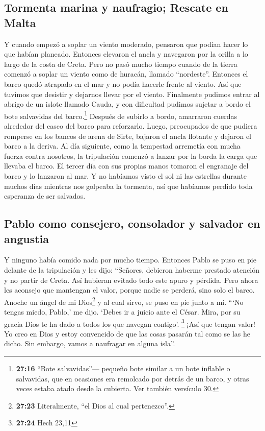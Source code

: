 \hypertarget{tormenta-marina-y-naufragio-rescate-en-malta}{%
\subsection{Tormenta marina y naufragio; Rescate en
Malta}\label{tormenta-marina-y-naufragio-rescate-en-malta}}

 Y cuando empezó a soplar un viento moderado, pensaron
que podían hacer lo que habían planeado. Entonces elevaron el ancla y
navegaron por la orilla a lo largo de la costa de Creta. 
Pero no pasó mucho tiempo cuando de la tierra comenzó a soplar un viento
como de huracán, llamado ``nordeste''.  Entonces el barco
quedó atrapado en el mar y no podía hacerle frente al viento. Así que
tuvimos que desistir y dejarnos llevar por el viento. 
Finalmente pudimos entrar al abrigo de un islote llamado Cauda, y con
dificultad pudimos sujetar a bordo el bote salvavidas del
barco.\footnote{\textbf{27:16} ``Bote salvavidas''--- pequeño bote
  similar a un bote inflable o salvavidas, que en ocasiones era
  remolcado por detrás de un barco, y otras veces estaba atado desde la
  cubierta. Ver también versículo 30.}  Después de
subirlo a bordo, amarraron cuerdas alrededor del casco del barco para
reforzarlo. Luego, preocupados de que pudiera romperse en los bancos de
arena de Sirte, bajaron el ancla flotante y dejaron el barco a la
deriva.  Al día siguiente, como la tempestad arremetía
con mucha fuerza contra nosotros, la tripulación comenzó a lanzar por la
borda la carga que llevaba el barco.  El tercer día con
sus propias manos tomaron el engranaje del barco y lo lanzaron al mar.
 Y no habíamos visto el sol ni las estrellas durante
muchos días mientras nos golpeaba la tormenta, así que habíamos perdido
toda esperanza de ser salvados.

\hypertarget{pablo-como-consejero-consolador-y-salvador-en-angustia}{%
\subsection{Pablo como consejero, consolador y salvador en
angustia}\label{pablo-como-consejero-consolador-y-salvador-en-angustia}}

 Y ninguno había comido nada por mucho tiempo. Entonces
Pablo se puso en pie delante de la tripulación y les dijo: ``Señores,
debieron haberme prestado atención y no partir de Creta. Así hubieran
evitado todo este apuro y pérdida.  Pero ahora les
aconsejo que mantengan el valor, porque nadie se perderá, sino solo el
barco.  Anoche un ángel de mi Dios\footnote{\textbf{27:23}
  Literalmente, ``el Dios al cual pertenezco''.} y al cual sirvo, se
puso en pie junto a mí.  ```No tengas miedo, Pablo,' me
dijo. `Debes ir a juicio ante el César. Mira, por su gracia Dios te ha
dado a todos los que navegan contigo'. \footnote{\textbf{27:24} Hech
  23,11}  ¡Así que tengan valor! Yo creo en Dios y estoy
convencido de que las cosas pasarán tal como se las he dicho.
 Sin embargo, vamos a naufragar en alguna isla''.

